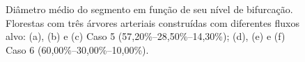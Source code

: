 \begin{figure}[!htb]
  \centering
  \captiondelim{: }
  \caption{Diâmetro médio do segmento em função de seu nível de bifurcação. 
  Florestas com três árvores arteriais construídas com diferentes fluxos alvo: 
  (a), (b) e (c) Caso 5 (57,20\%--28,50\%--14,30\%);  (d), (e) e (f) Caso 6 (60,00\%--30,00\%--10,00\%).}
  
  \hspace{12pt}


\end{figure}
